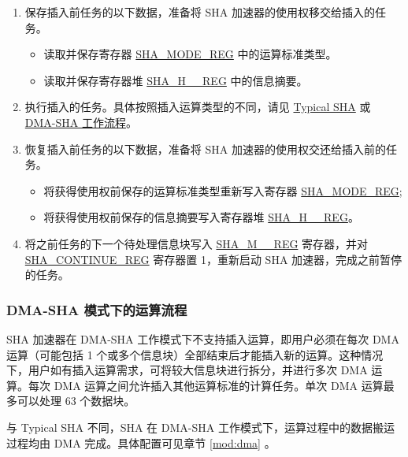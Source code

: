 \documentclass[main\_\_CN.tex]{subfiles}
\begin{document}
\begin{enumerate}
    \item 保存插入前任务的以下数据，准备将 SHA 加速器的使用权移交给插入的任务。
        \begin{itemize}
            \item 读取并保存寄存器 \hyperref[regdesc:SHAMODEREG]{SHA\_MODE\_REG} 中的运算标准类型。
            \item 读取并保存寄存器堆 \hyperref[regdesc:SHAHNREG]{SHA\_H\_\_REG} 中的信息摘要。
        \end{itemize}
    \item 执行插入的任务。具体按照插入运算类型的不同，请见 \hyperref[sec:sha-typical-sha]{Typical SHA} 或 \hyperref[sec:sha-dma-sha]{DMA-SHA 工作流程}。
    \item 恢复插入前任务的以下数据，准备将 SHA 加速器的使用权交还给插入前的任务。
        \begin{itemize}
            \item 将获得使用权前保存的运算标准类型重新写入寄存器 \hyperref[regdesc:SHAMODEREG]{SHA\_MODE\_REG};
            \item 将获得使用权前保存的信息摘要写入寄存器堆 \hyperref[regdesc:SHAHNREG]{SHA\_H\_\_REG}。
        \end{itemize}
    \item 将之前任务的下一个待处理信息块写入 \hyperref[regdesc:SHAMNREG]{SHA\_M\_\_REG} 寄存器，并对 \hyperref[regdesc:SHACONTINUEREG]{SHA\_CONTINUE\_REG} 寄存器置 1，重新启动 SHA 加速器，完成之前暂停的任务。
\end{enumerate}


\subsubsection{DMA-SHA 模式下的运算流程}\label{sec:sha-dma-sha}

\chipname{} SHA 加速器在 DMA-SHA 工作模式下不支持插入运算，即用户必须在每次 DMA 运算（可能包括 1 个或多个信息块）全部结束后才能插入新的运算。这种情况下，用户如有插入运算需求，可将较大信息块进行拆分，并进行多次 DMA 运算。每次 DMA 运算之间允许插入其他运算标准的计算任务。单次 DMA 运算最多可以处理 63 个数据块。

与 Typical SHA 不同，SHA 在 DMA-SHA 工作模式下，运算过程中的数据搬运过程均由 DMA 完成。具体配置可见章节 \ref{mod:dma} \textit{}。
\end{document}
